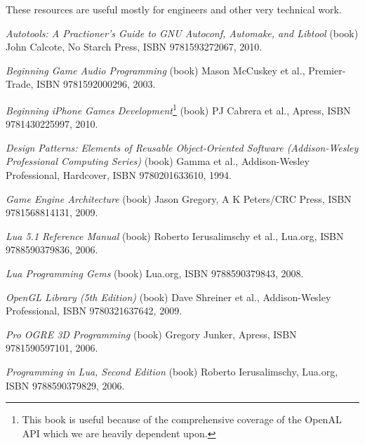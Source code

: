 
These resources are useful mostly for engineers and other very technical work.

\startitemize[4]
\setupwhitespace[big]
\item
{\it Autotools: A Practioner's Guide to GNU Autoconf, Automake, and Libtool} (book)\crlf
John Calcote, No Starch Press, ISBN 9781593272067, 2010.

\item
{\it Beginning Game Audio Programming} (book)\crlf
Mason McCuskey et al., Premier-Trade, ISBN 9781592000296, 2003.

\item
{\it Beginning iPhone Games Development}\footnote{This book is useful because of the comprehensive coverage of the OpenAL API which we are heavily dependent upon.} (book)\crlf
PJ Cabrera et al., Apress, ISBN 9781430225997, 2010.

\item
{\it Design Patterns: Elements of Reusable Object-Oriented Software (Addison-Wesley Professional Computing Series)} (book)\crlf
Gamma et al., Addison-Wesley Professional, Hardcover, ISBN 9780201633610, 1994.

\item
{\it Game Engine Architecture} (book)\crlf
Jason Gregory, A K Peters/CRC Press, ISBN 9781568814131, 2009.

\item
{\it Lua 5.1 Reference Manual} (book)\crlf
Roberto Ierusalimschy et al., Lua.org, ISBN 9788590379836, 2006.

\item
{\it Lua Programming Gems} (book)\crlf
Lua.org, ISBN 9788590379843, 2008.

\item
{\it OpenGL Library (5th Edition)} (book)\crlf
Dave Shreiner et al., Addison-Wesley Professional, ISBN 9780321637642, 2009.

\item
{\it Pro OGRE 3D Programming} (book)\crlf
Gregory Junker, Apress, ISBN 9781590597101, 2006.

\item
{\it Programming in Lua, Second Edition} (book)\crlf
Roberto Ierusalimschy, Lua.org, ISBN 9788590379829, 2006.

